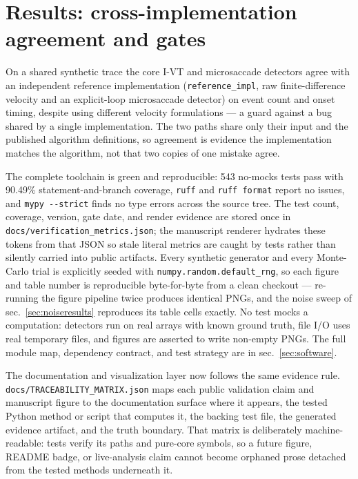 \documentclass[
]{article}
\begin{document}
\section{Results: cross-implementation agreement and
gates}\label{sec:reproducibility}

On a shared synthetic trace the core I-VT and microsaccade detectors
agree with an independent reference implementation
(\texttt{reference\_impl}, raw finite-difference velocity and an
explicit-loop microsaccade detector) on event count and onset timing,
despite using different velocity formulations --- a guard against a bug
shared by a single implementation. The two paths share only their input
and the published algorithm definitions, so agreement is evidence the
implementation matches the algorithm, not that two copies of one mistake
agree.

The complete toolchain is green and reproducible: 543 no-mocks tests
pass with 90.49\% statement-and-branch coverage, \texttt{ruff} and
\texttt{ruff\ format} report no issues, and \texttt{mypy\ -\/-strict}
finds no type errors across the source tree. The test count, coverage,
version, gate date, and render evidence are stored once in
\texttt{docs/verification\_metrics.json}; the manuscript renderer
hydrates these tokens from that JSON so stale literal metrics are caught
by tests rather than silently carried into public artifacts. Every
synthetic generator and every Monte-Carlo trial is explicitly seeded
with \texttt{numpy.random.default\_rng}, so each figure and table number
is reproducible byte-for-byte from a clean checkout --- re-running the
figure pipeline twice produces identical PNGs, and the noise sweep of
sec.~\ref{sec:noiseresults} reproduces its table cells exactly. No test
mocks a computation: detectors run on real arrays with known ground
truth, file I/O uses real temporary files, and figures are asserted to
write non-empty PNGs. The full module map, dependency contract, and test
strategy are in sec.~\ref{sec:software}.

The documentation and visualization layer now follows the same evidence
rule. \texttt{docs/TRACEABILITY\_MATRIX.json} maps each public
validation claim and manuscript figure to the documentation surface
where it appears, the tested Python method or script that computes it,
the backing test file, the generated evidence artifact, and the truth
boundary. That matrix is deliberately machine-readable: tests verify its
paths and pure-core symbols, so a future figure, README badge, or
live-analysis claim cannot become orphaned prose detached from the
tested methods underneath it.
\end{document}
